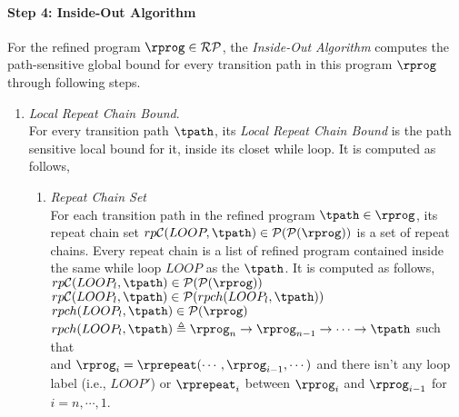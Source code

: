 \paragraph{Step 4: Inside-Out Algorithm}
For the refined program $\rprog \in \mathcal{RP}$, the \emph{Inside-Out Algorithm}
computes the path-sensitive global bound for every transition path in this program $\rprog$ through following steps.

\begin{enumerate}
  \item \emph{Local Repeat Chain Bound}.
  \\
  For every transition path $\tpath$, its \emph{Local Repeat Chain Bound} is the 
  path sensitive local bound for it, inside its closet while loop.
  It is computed as follows,
  \begin{enumerate}
\item \emph{Repeat Chain Set}
\\
For each transition path in the refined program $\tpath \in \rprog$, 
its repeat chain set $rp\mathcal{C}(LOOP, \tpath) \in \mathcal{P}(\mathcal{P}(\rprog))$
 is a set of repeat chains. 
 Every repeat chain is a list of refined program contained inside the same while loop $LOOP$ as the $\tpath$. It is computed as follows,
\\
$rp\mathcal{C}(LOOP_l, \tpath) \in \mathcal{P}(\mathcal{P}(\rprog))$
\\
 $rp\mathcal{C}(LOOP_l, \tpath) \in \mathcal{P}(rpch(LOOP_l, \tpath))$
  \\
  $rpch(LOOP_l, \tpath) \in \mathcal{P}(\rprog)$\\
  $rpch(LOOP_l, \tpath) \triangleq \rprog_n \to \rprog_{n-1} \to \cdots \to \tpath $
 such that \\
 and
 $\rprog_{i}= \rprepeat(\cdots, \rprog_{i - 1}, \cdots)$ and
 there isn't any loop label (i.e., $LOOP'$) or $\rprepeat_i$ between $\rprog_{i}$ and $\rprog_{i - 1}$ for $i = n, \cdots, 1$.

\end{enumerate}
\end{enumerate}
